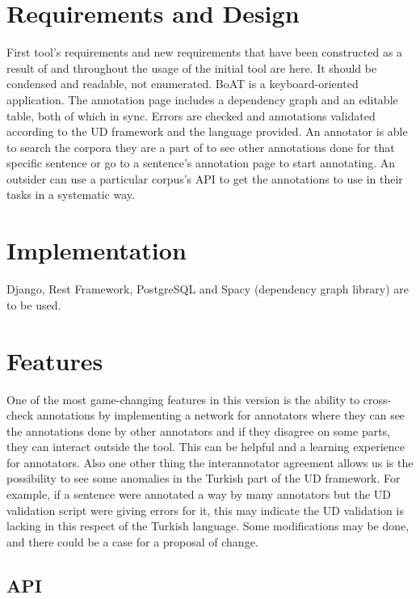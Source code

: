 \documentclass[
]{ceurart}
\begin{document}
\section{Requirements and Design}

First tool's requirements and new requirements that have been constructed as a result of and throughout the usage of the initial tool are here. It should be condensed and readable, not enumerated.
BoAT is a keyboard-oriented application. The annotation page includes a dependency graph and an editable table, both of which in sync. Errors are checked and annotations validated according to the UD framework and the language provided.
An annotator is able to search the corpora they are a part of to see other annotations done for that specific sentence or go to a sentence's annotation page to start annotating.
An outsider can use a particular corpus's API to get the annotations to use in their tasks in a systematic way.

\section{Implementation}

Django, Rest Framework, PostgreSQL and Spacy (dependency graph library) are to be used.

\section{Features}

One of the most game-changing features in this version is the ability to cross-check annotations by implementing a network for annotators where they can see the annotations done by other annotators and if they disagree on some parts, they can interact outside the tool. This can be helpful and a learning experience for annotators.
Also one other thing the interannotator agreement allows us is the possibility to see some anomalies in the Turkish part of the UD framework. For example, if a sentence were annotated a way by many annotators but the UD validation script were giving errors for it, this may indicate the UD validation is lacking in this respect of the Turkish language. Some modifications may be done, and there could be a case for a proposal of change.

\subsection{API}
\end{document}
